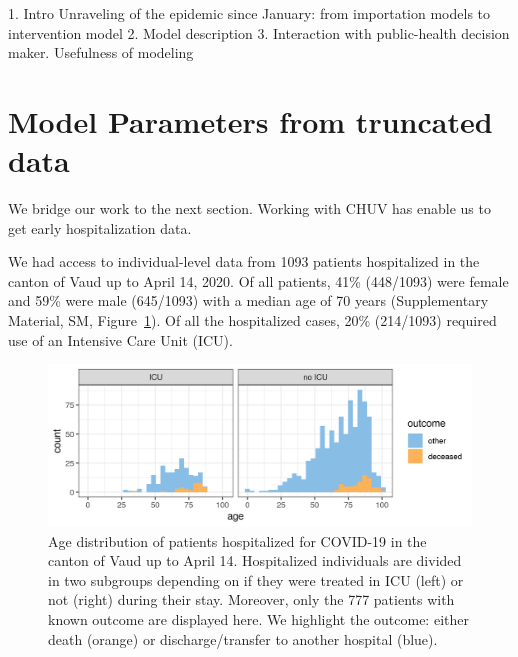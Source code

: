  

1. Intro Unraveling of the epidemic since January: from importation models to intervention model
2. Model description
3. Interaction with public-health decision maker. Usefulness of modeling

\section{Model Parameters from truncated data}

We bridge our work to the next section. Working with CHUV has enable us to get early hospitalization data.

We had access to individual-level data from 1093 patients hospitalized in the canton of Vaud up to April 14, 2020. Of all patients, 41\% (448/1093) were female and 59\% were male (645/1093) with a median age of 70 years (Supplementary Material, SM, Figure~\ref{fig:vdage}). Of all the hospitalized cases, 20\% (214/1093) required use of an Intensive Care Unit (ICU).

\begin{figure}[!htb]
    \centering
    \includegraphics[width = .7\textwidth]{fig_covid-switzerland-npi/fig_supp/VD_hist_age.png}
    \caption[Age distribution of patients hospitalized for COVID-19 in the canton of Vaud]{Age distribution of patients hospitalized for COVID-19 in the canton of Vaud up to April 14. Hospitalized individuals are divided in two subgroups depending on if they were treated in ICU (left) or not (right) during their stay. Moreover, only the 777 patients with known outcome are displayed here. We highlight the outcome:  either death (orange) or discharge/transfer to another hospital (blue).}
    \label{fig:vdage}
\end{figure}

